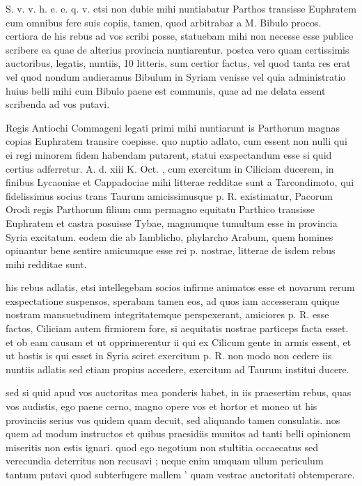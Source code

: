 


 S. v. v. h. e. e. q. v. etsi non dubie mihi nuntiabatur Parthos transisse Euphratem cum omnibus fere suis copiis, tamen, quod arbitrabar a M. Bibulo procos. certiora de his rebus ad vos scribi posse, statuebam mihi non necesse esse publice scribere ea quae de alterius provincia nuntiarentur. postea vero quam certissimis auctoribus, legatis, nuntiis, 10 litteris, sum certior factus, vel quod tanta res erat vel quod nondum audieramus Bibulum in Syriam venisse vel quia administratio huius belli mihi cum Bibulo paene est communis, quae ad me delata essent scribenda ad vos putavi.

 Regis Antiochi Commageni legati primi mihi nuntiarunt is Parthorum magnas copias Euphratem transire coepisse. quo nuptio adlato, cum essent non nulli qui ei regi minorem fidem habendam putarent, statui exspectandum esse si quid certius adferretur. A. d. xiii K. Oct. , cum exercitum in Ciliciam ducerem, in finibus Lycaoniae et Cappadociae mihi litterae redditae sunt a Tarcondimoto, qui fidelissimus socius trans Taurum amicissimusque p. R. existimatur, Pacorum Orodi regis Parthorum filium cum permagno equitatu Parthico transisse Euphratem et castra posuisse Tybae, magnumque tumultum esse in provincia Syria excitatum. eodem die ab Iamblicho, phylarcho Arabum, quem homines opinantur bene sentire amicumque esse rei p. nostrae, litterae de isdem rebus mihi redditae sunt.

 his rebus adlatis, etsi intellegebam socios infirme animatos esse et novarum rerum exspectatione suspensos, sperabam tamen eos, ad quos iam accesseram quique nostram mansuetudinem integritatemque perspexerant, amiciores p. R. esse factos, Ciliciam autem firmiorem fore, si aequitatis nostrae particeps facta esset. et ob eam causam et ut opprimerentur ii qui ex Cilicum gente in armis essent, et ut hostis is qui esset in Syria sciret exercitum p. R. non modo non cedere iis nuntiis adlatis sed etiam propius accedere, exercitum ad Taurum institui ducere.

 sed si quid apud vos auctoritas mea ponderis habet, in iis praesertim rebus, quas vos audistis, ego paene cerno, magno opere vos et hortor et moneo ut his provinciis serius vos quidem quam decuit, sed aliquando tamen consulatis. nos quem ad modum instructos et quibus praesidiis munitos ad tanti belli opinionem miseritis non estis ignari. quod ego negotium non stultitia occaecatus sed verecundia deterritus non recusavi ; neque enim umquam ullum periculum tantum putavi quod subterfugere mallem ' quam vestrae auctoritati obtemperare.

